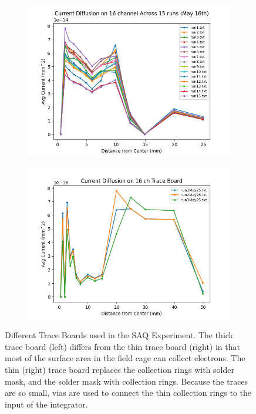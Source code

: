 \begin{figure}[]
\centering
\begin{subfigure}{.45\textwidth}
  \centering
  \includegraphics[width=\textwidth]{images/fullBoard_ConvertedAvgCurrentDiffusion.png}
  \caption{}
\end{subfigure}%
\begin{subfigure}{.45\textwidth}
  \centering
  \includegraphics[width=\textwidth]{images/traceBoard_ConvertedAvgCurrentDiffusion.png}
  \caption{}
\end{subfigure}
\caption{Different Trace Boards used in the SAQ Experiment.
The thick trace board (left) differs from the thin trace board (right) in that most of the surface area in the field cage can collect electrons.
The thin (right) trace board replaces the collection rings with solder mask, and the solder mask with collection rings.
Because the traces are so small, vias are used to connect the thin collection rings to the input of the integrator.
}
\label{fig:trace_boards_current_data}
\end{figure}


